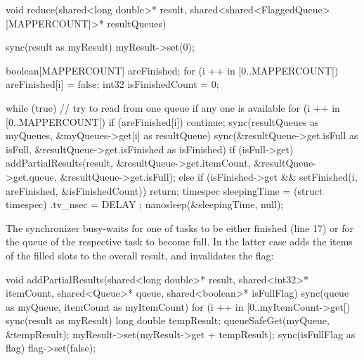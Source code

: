 \begin{ccode}
void reduce(shared<long double>* result, shared<shared<FlaggedQueue>[MAPPERCOUNT]>* resultQueues) { 
  sync(result as myResult) { myResult->set(0); } 
   
  boolean[MAPPERCOUNT] areFinished; 
  for (i ++ in [0..MAPPERCOUNT[) { areFinished[i] = false; }
  int32 isFinishedCount = 0; 
   
  while (true) { 
    // try to read from one queue if any one is available  
    for (i ++ in [0..MAPPERCOUNT[) { 
      if (areFinished[i]) { continue; }
      sync(resultQueues as myQueues, &myQueues->get[i] as resultQueue) {
        sync(&resultQueue->get.isFull as isFull, &resultQueue->get.isFinished as isFinished) { 
          if (isFull->get) { 
            addPartialResults(result, &resultQueue->get.itemCount, &resultQueue->get.queue, 
                              &resultQueue->get.isFull); 
          } else if (isFinished->get && setFinished(i, areFinished, &isFinishedCount)) { 
            return; 
          } 
        } 
      } 
    }
    timespec sleepingTime = (struct timespec){ .tv_nsec = DELAY }; 
    nanosleep(&sleepingTime, null); 
  }
}
\end{ccode}
The synchronizer busy-waits for one of tasks to be either finished (line 17) or for the queue of the respective task to become full. In the latter case  adds the items of the filled slots to the overall result, and invalidates the  flag:
\begin{ccode}
void addPartialResults(shared<long double>* result, shared<int32>* itemCount, shared<Queue>* queue, shared<boolean>* isFullFlag) {
  sync(queue as myQueue, itemCount as myItemCount) { 
    for (i ++ in [0..myItemCount->get[) {
      sync(result as myResult) { 
        long double tempResult; 
        queueSafeGet(myQueue, &tempResult); 
        myResult->set(myResult->get + tempResult); 
      } 
    }
  } 
  sync(isFullFlag as flag) { flag->set(false); } 
}
\end{ccode}
